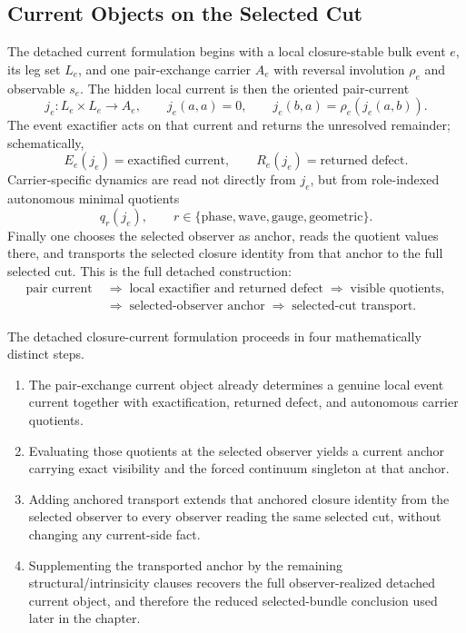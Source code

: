 \subsection{Current Objects on the Selected Cut}
\label{sec:detached-current-build}

The detached current formulation begins with a local closure-stable bulk event
\(e\), its leg set \(L_e\), and one pair-exchange carrier \(A_e\) with reversal
involution \(\rho_e\) and observable \(s_e\). The hidden local current is then
the oriented pair-current
\[
j_e : L_e \times L_e \to A_e,
\qquad
j_e(a,a)=0,
\qquad
j_e(b,a)=\rho_e(j_e(a,b)).
\]
The event exactifier acts on that current and returns the unresolved remainder;
schematically,
\[
E_e(j_e)=\text{exactified current},
\qquad
R_e(j_e)=\text{returned defect}.
\]
Carrier-specific dynamics are read not directly from \(j_e\), but from
role-indexed autonomous minimal quotients
\[
q_r(j_e),
\qquad
r \in \{\mathrm{phase},\mathrm{wave},\mathrm{gauge},\mathrm{geometric}\}.
\]
Finally one chooses the selected observer as anchor, reads the quotient values
there, and transports the selected closure identity from that anchor to
the full selected cut. This is the full detached construction:
\[
\begin{aligned}
\text{pair current}
&\;\Longrightarrow\;
\text{local exactifier and returned defect}
\;\Longrightarrow\;
\text{visible quotients},
\\
&\;\Longrightarrow\;
\text{selected-observer anchor}
\;\Longrightarrow\;
\text{selected-cut transport}.
\end{aligned}
\]

\begin{theorem}
\label{thm:detached-current-build-ladder}
The detached closure-current formulation proceeds in four mathematically
distinct steps.
\begin{enumerate}[label=(\roman*), leftmargin=2em, itemsep=0.2em]
\item The pair-exchange current object already determines a genuine local event
      current together with exactification, returned defect, and autonomous
      carrier quotients.
\item Evaluating those quotients at the selected observer yields a
      current anchor carrying exact visibility and the forced continuum
      singleton at that anchor.
\item Adding anchored transport extends that anchored closure identity from the
      selected observer to every observer reading the same selected cut,
      without changing any current-side fact.
\item Supplementing the transported anchor by the remaining
      structural/intrinsicity
      clauses recovers the full observer-realized detached current object, and
      therefore the reduced selected-bundle conclusion used later in the
      chapter.
\end{enumerate}
\end{theorem}

